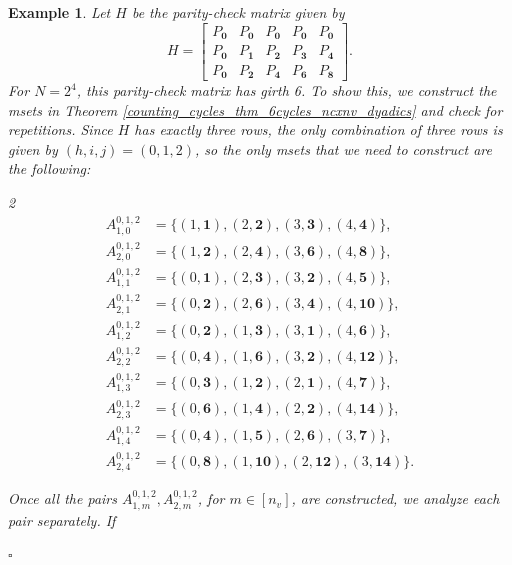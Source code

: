 \documentclass[11pt]{article}
\theoremstyle{plain}
\theoremstyle{plain}
\newtheorem{PreExample}[lemma]{{\textbf{Example}}}
\newenvironment{example}%
    {\begin{PreExample}\upshape}{\hfill$\square$\end{PreExample}}
\theoremstyle{definition}
\numberwithin{theo}{section}
\def\matrix#1{\begin{bmatrix}#1\end{bmatrix}} %
\newcounter{ara}
\begin{document}
\begin{example}
\label{counting_cycles_example_6cycles_g6_dyadics}
Let $H$ be the parity-check matrix given by 
\begin{equation*}
H = \matrix{ P_{\mathbf{0}}&P_{\mathbf{0}}&P_{\mathbf{0}}&P_{\mathbf{0}}&P_{\mathbf{0}} \\ P_{\mathbf{0}}&P_{\mathbf{1}}&P_{\mathbf{2}}&P_{\mathbf{3}}&P_{\mathbf{4}} \\ P_{\mathbf{0}}&P_{\mathbf{2}}&P_{\mathbf{4}}&P_{\mathbf{6}}&P_{\mathbf{8}}}.
 \end{equation*}
For $N=2^4$, this parity-check matrix has girth 6. To show this, we construct the msets in Theorem \ref{counting_cycles_thm_6cycles_ncxnv_dyadics} and check for repetitions. Since $H$ has exactly three rows, the only combination of three rows is given by 
$(h,i,j)=(0,1,2)$, so the only msets that we need to construct are the following:
\begin{multicols}{2}
\noindent
\begin{align*}
A_{1,0}^{0,1,2} &= \{(1, \mathbf{1}), (2, \mathbf{2}), (3, \mathbf{3}), (4, \mathbf{4})\}, \\
A_{2,0}^{0,1,2} &= \{(1, \mathbf{2}), (2, \mathbf{4}), (3, \mathbf{6}), (4, \mathbf{8})\}, \\
A_{1,1}^{0,1,2} &= \{(0, \mathbf{1}), (2, \mathbf{3}), (3, \mathbf{2}), (4, \mathbf{5})\}, \\
A_{2,1}^{0,1,2} &= \{(0, \mathbf{2}), (2, \mathbf{6}), (3, \mathbf{4}), (4, \mathbf{10})\}, \\
A_{1,2}^{0,1,2} &= \{(0, \mathbf{2}), (1, \mathbf{3}), (3, \mathbf{1}), (4, \mathbf{6})\}, \\
A_{2,2}^{0,1,2} &= \{(0, \mathbf{4}), (1, \mathbf{6}), (3, \mathbf{2}), (4, \mathbf{12})\}, \\
A_{1,3}^{0,1,2} &= \{(0, \mathbf{3}), (1, \mathbf{2}), (2, \mathbf{1}), (4, \mathbf{7})\}, \\
A_{2,3}^{0,1,2} &= \{(0, \mathbf{6}), (1, \mathbf{4}), (2, \mathbf{2}), (4, \mathbf{14})\}, \\
A_{1,4}^{0,1,2} &= \{(0, \mathbf{4}), (1, \mathbf{5}), (2, \mathbf{6}), (3, \mathbf{7})\}, \\
A_{2,4}^{0,1,2} &= \{(0, \mathbf{8}), (1, \mathbf{10}), (2, \mathbf{12}), (3, \mathbf{14})\}.
\end{align*}
\end{multicols}
\noindent Once all the pairs 
$A_{1,m}^{0,1,2},A_{2,m}^{0,1,2}$, for 
$m\in[n_v]$, are constructed, we analyze each pair separately. If 

\end{example}
\end{document}
